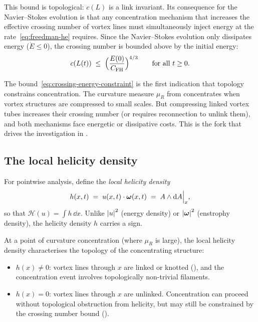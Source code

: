 This bound is topological: $c(L)$ is a link invariant.  Its consequence for
the Navier--Stokes evolution is that any concentration mechanism that
increases the effective crossing number of vortex lines must simultaneously
inject energy at the rate~\eqref{eq:freedman-he} requires.  Since the
Navier--Stokes evolution only dissipates energy ($\dot{E} \leq 0$), the
crossing number is bounded above by the initial energy:
\begin{equation}\label{eq:crossing-energy-constraint}
  c(L(t)) \;\leq\; \Bigl(\frac{E(0)}{C_{\mathrm{FH}}}\Bigr)^{4/3}
  \qquad\text{for all } t \geq 0.
\end{equation}

\begin{remark}\label{rem:crossing-concentration}
  The bound~\eqref{eq:crossing-energy-constraint} is the first indication that
  topology constrains concentration.  The curvature measure $\mu_R$ from
   concentrates when vortex structures are compressed
  to small scales.  But compressing linked vortex tubes increases their crossing
  number (or requires reconnection to unlink them), and both mechanisms face
  energetic or dissipative costs.
  This is the fork that drives the investigation in .
\end{remark}

\subsection{The local helicity density}\label{sec:det-local-helicity}

For pointwise analysis, define the \emph{local helicity density}
\begin{equation}\label{eq:local-helicity}
  h(x,t) \;=\; u(x,t)\cdot\boldsymbol{\omega}(x,t) \;=\; A\wedge\mathrm{d} A\Big|_x,
\end{equation}
so that $\mathcal{H}(u) = \int h\,\dd x$.  Unlike $\left\lvert u \right\rvert^2$ (energy density)
or $\left\lvert \boldsymbol{\omega} \right\rvert^2$ (enstrophy density), the helicity density $h$ carries a sign.

At a point of curvature concentration (where $\mu_R$ is large), the local helicity
density characterises the topology of the concentrating structure:
\begin{itemize}
  \item $h(x) \neq 0$: vortex lines through $x$ are linked or knotted
    (\cite{moffatt1969degree}), and the concentration event involves
    topologically non-trivial filaments.
  \item $h(x) = 0$: vortex lines through $x$ are unlinked.  Concentration can
    proceed without topological obstruction from helicity, but may still be
    constrained by the crossing number bound ().
\end{itemize}

